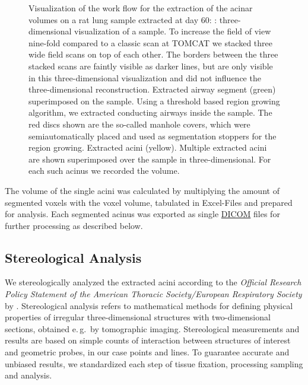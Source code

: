 \documentclass[%
	paper=a4,%
	abstract=true,%
	]{scrartcl}
\newlength\imagescale		%
\newcommand{\eg}{e.\,g.\ }
\begin{document}
\begin{figure}
{%
		\label{subfig:extracted acini}%
		}
	\caption{Visualization of the work flow for the extraction of the acinar volumes on a rat lung sample extracted at day 60: %
		: three-dimensional visualization of a sample. To increase the field of view nine-fold compared to a classic scan at TOMCAT we stacked three wide field scans on top of each other. The borders between the three stacked scans are faintly visible as darker lines, but are only visible in this three-dimensional visualization and did not influence the three-dimensional reconstruction. %
		 Extracted airway segment (green) superimposed on the sample. Using a threshold based region growing algorithm, we extracted conducting airways inside the sample. The red discs shown are the so-called manhole covers, which were semiautomatically placed and used as segmentation stoppers for the region growing. %
		 Extracted acini (yellow). Multiple extracted acini are shown superimposed over the sample in three-dimensional. For each such acinus we recorded the volume.%
		}
	\label{fig:workflow}
\end{figure}

The volume of the single acini was calculated by multiplying the amount of segmented voxels with the voxel volume, tabulated in Excel-Files and prepared for analysis. Each segmented acinus was exported as single \href{https://secure.wikimedia.org/wikipedia/en/w/index.php?title=Digital_Imaging_and_Communications_in_Medicine&oldid=415023605}{DICOM} files for further processing as described below.

\subsection{Stereological Analysis}
We stereologically analyzed the extracted acini according to the \emph{Official Research Policy Statement of the American Thoracic Society/European Respiratory Society} by \citet{Hsia2010}. Stereological analysis refers to mathematical methods for defining physical properties of irregular three-dimensional structures with two-dimensional sections, obtained \eg by tomographic imaging. Stereological measurements and results are based on simple counts of interaction between structures of interest and geometric probes, in our case points and lines. To guarantee accurate and unbiased results, we standardized each step of tissue fixation, processing sampling and analysis.
\end{document}
